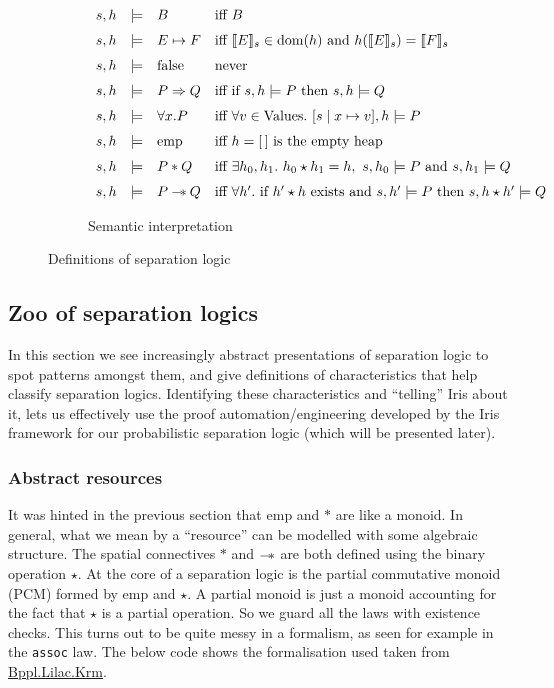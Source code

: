 \begin{figure}[htbp]
    \begin{subfigure}[t]{0.95\textwidth}
        \centering
        \[
        \begin{array}{rcll}
        s,h & \models & B & \text{iff } B \\[0.6em]
        s,h & \models & E \mapsto F & \text{iff } \denote{E}{s} \in \mathrm{dom}(h) \text{ and } h(\denote{E}{s})=\denote{F}{s} \\[0.6em]
        s,h & \models & \mathrm{false} & \text{never} \\[0.6em]
        s,h & \models & P \Rightarrow Q & \text{iff if } s,h \models P \text{ then } s,h \models Q \\[0.6em]
        s,h & \models & \forall x.P & \text{iff } \forall v \in \text{Values}.\ [s \mid x \mapsto v],h \models P \\[0.6em]
        s,h & \models & \mathrm{emp} & \text{iff } h = [\,] \text{ is the empty heap} \\[0.6em]
        s,h & \models & P * Q & \text{iff } \exists h_0,h_1.\ h_0 \star h_1 = h,\ s,h_0 \models P \text{ and } s,h_1 \models Q \\[0.6em]
        s,h & \models & P \wand Q & \text{iff } \forall h'.\ \text{if } h' \star h \text{ exists and } s,h' \models P \text{ then } s,h \star h' \models Q
        \end{array}
        \]
        \caption{Semantic interpretation}
    \end{subfigure}

    \caption{Definitions of separation logic}
    \label{fig:sep-logic}
\end{figure}

\subsection{Zoo of separation logics}
In this section we see increasingly abstract presentations of separation logic to spot patterns amongst them, and give definitions of characteristics that help classify separation logics.
Identifying these characteristics and ``telling'' Iris about it, lets us effectively use the proof automation/engineering developed by the Iris framework for our probabilistic separation
logic (which will be presented later).

\subsubsection{Abstract resources}
It was hinted in the previous section that $\mathrm{emp}$ and $*$ are like a monoid. In general, what we mean by a ``resource'' can be modelled with some algebraic structure. The spatial connectives $*$ and $\mathbin{-\!*}$
are both defined using the binary operation $\star$. At the core of a separation logic is the partial commutative monoid (PCM) formed by $\mathrm{emp}$ and $\star$. A partial monoid
is just a monoid accounting for the fact that $\star$ is a partial operation. So we guard all the laws with existence checks. This turns out to be quite messy in a formalism, as seen for example in the \texttt{assoc}
law. The below code shows the formalisation used taken from \href{https://github.com/edwin1729/bppl-logic/blob/submission/Bppl/Lilac/Krm.lean}{Bppl.Lilac.Krm}.

